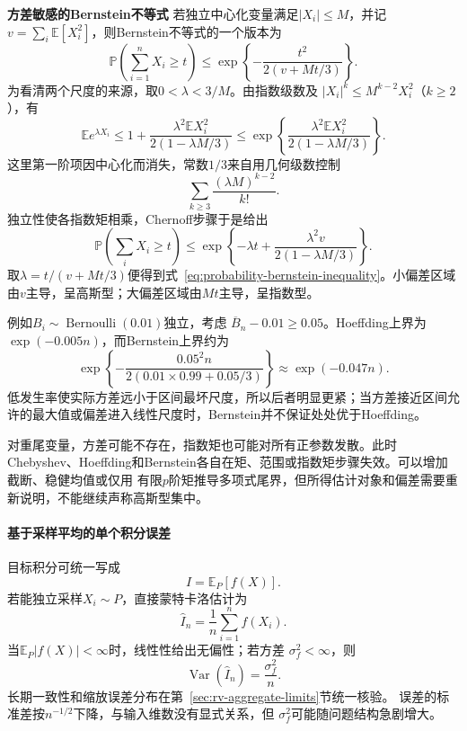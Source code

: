 \par\medskip\noindent\textbf{方差敏感的Bernstein不等式}\quad
若独立中心化变量满足\(|X_i|\leq M\)，并记\(v=\sum_i\mathbb{E}[X_i^2]\)，则Bernstein不等式的一个版本为
\begin{equation}
  \mathbb{P}\left(\sum_{i=1}^{n}X_i\geq t\right)
  \leq
  \exp\left\{
    -\frac{t^2}{2(v+Mt/3)}
  \right\}.
  \label{eq:probability-bernstein-inequality}
\end{equation}
为看清两个尺度的来源，取\(0<\lambda<3/M\)。由指数级数及
\(|X_i|^k\leq M^{k-2}X_i^2\)（\(k\geq2\)），有
\[
  \mathbb{E}e^{\lambda X_i}
  \leq
  1+\frac{\lambda^2\mathbb{E}X_i^2}
           {2(1-\lambda M/3)}
  \leq
  \exp\left\{
    \frac{\lambda^2\mathbb{E}X_i^2}
         {2(1-\lambda M/3)}
  \right\}.
\]
这里第一阶项因中心化而消失，常数\(1/3\)来自用几何级数控制
\[
  \sum_{k\geq3}\frac{(\lambda M)^{k-2}}{k!}.
\]
独立性使各指数矩相乘，Chernoff步骤于是给出
\[
  \mathbb{P}\left(\sum_iX_i\geq t\right)
  \leq
  \exp\left\{
    -\lambda t+\frac{\lambda^2v}
      {2(1-\lambda M/3)}
  \right\}.
\]
取\(\lambda=t/(v+Mt/3)\)便得到式~\eqref{eq:probability-bernstein-inequality}。小偏差区域由\(v\)主导，呈高斯型；大偏差区域由\(Mt\)主导，呈指数型。

例如\(B_i\sim\operatorname{Bernoulli}(0.01)\)独立，考虑
\(\overline{B}_n-0.01\geq0.05\)。Hoeffding上界为
\(\exp(-0.005n)\)，而Bernstein上界约为
\[
  \exp\left\{
    -\frac{0.05^2n}
      {2(0.01\times0.99+0.05/3)}
  \right\}
  \approx \exp(-0.047n).
\]
低发生率使实际方差远小于区间最坏尺度，所以后者明显更紧；当方差接近区间允许的最大值或偏差进入线性尺度时，Bernstein并不保证处处优于Hoeffding。

对重尾变量，方差可能不存在，指数矩也可能对所有正参数发散。此时Chebyshev、Hoeffding和Bernstein各自在矩、范围或指数矩步骤失效。可以增加截断、稳健均值或仅用
有限\(p\)阶矩推导多项式尾界，但所得估计对象和偏差需要重新说明，不能继续声称高斯型集中。

\paragraph{基于采样平均的单个积分误差}
\label{sec:probability-monte-carlo-variance-reduction}
目标积分可统一写成
\[ I=\mathbb{E}_P[f(X)]. \]
若能独立采样\(X_i\sim P\)，直接蒙特卡洛估计为
\[ \widehat{I}_n
  =\frac{1}{n}\sum_{i=1}^{n}f(X_i). \]
当\(\mathbb E_P|f(X)|<\infty\)时，线性性给出无偏性；若方差
\(\sigma_f^2<\infty\)，则
\[ \operatorname{Var}(\widehat I_n)=\frac{\sigma_f^2}{n}. \]
长期一致性和缩放误差分布在第~\ref{sec:rv-aggregate-limits}节统一核验。
误差的标准差按\(n^{-1/2}\)下降，与输入维数没有显式关系，但
\(\sigma_f^2\)可能随问题结构急剧增大。

